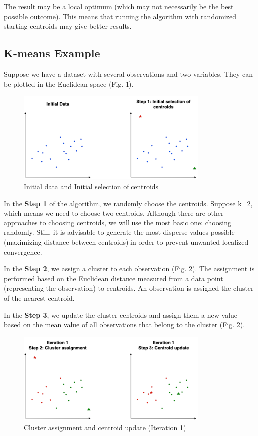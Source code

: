 \documentclass[]{article}
\begin{document}
The result may be a local optimum (which may not necessarily be the best
possible outcome). This means that running the algorithm with randomized
starting centroids may give better results.

\subsection{K-means Example}\label{k-means-example}

Suppose we have a dataset with several observations and two variables.
They can be plotted in the Euclidean space (Fig. 1).

\begin{figure}[H]

{\centering \includegraphics[width=350px]{images/steps_0_1} 

}

\caption{Initial data and Initial selection of centroids}\label{fig:unnamed-chunk-2}
\end{figure}

In the \textbf{Step 1} of the algorithm, we randomly choose the
centroids. Suppose k=2, which means we need to choose two centroids.
Although there are other approaches to choosing centroids, we will use
the most basic one: choosing randomly. Still, it is advisable to
generate the most disperse values possible (maximizing distance between
centroids) in order to prevent unwanted localized convergence.

In the \textbf{Step 2}, we assign a cluster to each observation (Fig.
2). The assignment is performed based on the Euclidean distance measured
from a data point (representing the observation) to centroids. An
observation is assigned the cluster of the nearest centroid.

In the \textbf{Step 3}, we update the cluster centroids and assign them
a new value based on the mean value of all observations that belong to
the cluster (Fig. 2).

\begin{figure}[H]

{\centering \includegraphics[width=350px]{images/steps_2_3_iter1} 

}

\caption{Cluster assignment and centroid update (Iteration 1)}\label{fig:unnamed-chunk-3}
\end{figure}
\end{document}

